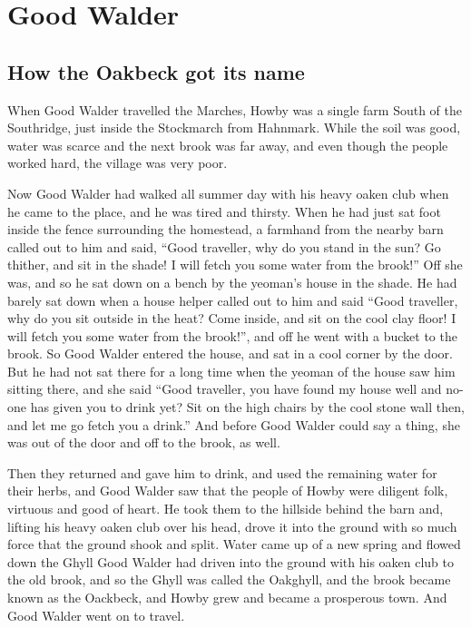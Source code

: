\section{Good Walder}
\subsection{How the Oakbeck got its name}
When Good Walder travelled the Marches, Howby was a single farm South of the Southridge, just inside the Stockmarch from Hahnmark.
While the soil was good, water was scarce and the next brook was far away, and even though the people worked hard, the village was very poor.

Now Good Walder had walked all summer day with his heavy oaken club when he came to the place, and he was tired and thirsty.
When he had just sat foot inside the fence surrounding the homestead, a farmhand from the nearby barn called out to him and said, “Good traveller, why do you stand in the sun? Go thither, and sit in the shade! I will fetch you some water from the brook!”
Off she was, and so he sat down on a bench by the yeoman's house in the shade.
He had barely sat down when a house helper called out to him and said “Good traveller, why do you sit outside in the heat? Come inside, and sit on the cool clay floor! I will fetch you some water from the brook!”, and off he went with a bucket to the brook.
So Good Walder entered the house, and sat in a cool corner by the door.
But he had not sat there for a long time when the yeoman of the house saw him sitting there, and she said “Good traveller, you have found my house well and no-one has given you to drink yet? Sit on the high chairs by the cool stone wall then, and let me go fetch you a drink.”
And before Good Walder could say a thing, she was out of the door and off to the brook, as well.

Then they returned and gave him to drink, and used the remaining water for their herbs, and Good Walder saw that the people of Howby were diligent folk, virtuous and good of heart. He took them to the hillside behind the barn and, lifting his heavy oaken club over his head, drove it into the ground with so much force that the ground shook and split.
Water came up of a new spring and flowed down the Ghyll Good Walder had driven into the ground with his oaken club to the old brook, and so the Ghyll was called the Oakghyll, and the brook became known as the Oackbeck, and Howby grew and became a prosperous town.
And Good Walder went on to travel.
